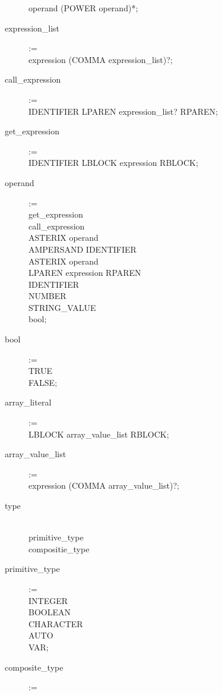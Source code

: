 \begin{description}
        operand (POWER operand)*;
    \item[expression\_list] := \hfill \\
        expression (COMMA expression\_list)?;
    \item[call\_expression] := \hfill \\
        IDENTIFIER LPAREN expression\_list? RPAREN;
    \item[get\_expression] := \hfill \\
        IDENTIFIER LBLOCK expression RBLOCK; 
    \item[operand \\] := \hfill \\
        get\_expression \textbar \\
        call\_expression \textbar \\
        ASTERIX operand \textbar \\
        AMPERSAND IDENTIFIER \textbar \\
        ASTERIX operand \textbar \\
        LPAREN expression RPAREN \textbar \\
        IDENTIFIER \textbar \\
        NUMBER \textbar \\
        STRING\_VALUE \textbar \\
        bool;
    \item[bool] := \hfill \\
        TRUE  \textbar \\
        FALSE;
    \item[array\_literal] := \hfill \\
        LBLOCK array\_value\_list RBLOCK;
    \item[array\_value\_list] := \hfill \\
        expression (COMMA array\_value\_list)?;
    \item[type] \hfill \\
        primitive\_type \\
        compositie\_type
    \item[primitive\_type] := \hfill \\
        INTEGER \textbar \\
        BOOLEAN \textbar \\
        CHARACTER \textbar \\
        AUTO \textbar \\
        VAR;
    \item[composite\_type] := \hfill \\

\end{description}
